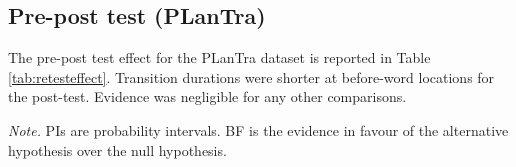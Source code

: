 \clearpage
\makeatletter
\efloat@restorefloats
\makeatother


\begin{appendix}
\section{}
\hypertarget{pre-post-test-plantra}{%
\subsection{Pre-post test (PLanTra)}\label{pre-post-test-plantra}}

The pre-post test effect for the PLanTra dataset is reported in Table
\ref{tab:retesteffect}. Transition durations were shorter at before-word
locations for the post-test. Evidence was negligible for any other
comparisons.

\begin{center}
\begin{ThreePartTable}

\begin{TableNotes}[para]
\normalsize{\textit{Note.} PIs are probability intervals. BF is the evidence in favour of the alternative hypothesis over the null hypothesis.}
\end{TableNotes}

\footnotesize{

}
\end{ThreePartTable}
\end{center}
\end{appendix}
